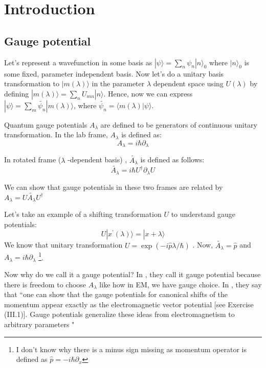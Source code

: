 \documentclass[11pt,a4paper]{article}
\begin{document}
 

\section{Introduction}

\subsection{Gauge potential}
Let's represent a wavefunction in some basis as $|\psi \rangle= \sum_n \psi_n |n \rangle_0$
where $|n \rangle_0$ is some fixed, parameter independent basis. Now let's do a unitary basis transformation to $|m (\lambda) \rangle$ in the parameter $\lambda$ dependent space using $U(\lambda)$ by defining $|m (\lambda) \rangle= \sum_n U_{mn} |n \rangle$. Hence, now we can express $|\psi \rangle = \sum_m \tilde{\psi_n}  |m (\lambda) \rangle $, where $\tilde{\psi_n}= \langle  m (\lambda) |\psi \rangle$. 
 
Quantum gauge potentials $A_{\lambda}$ are defined to be generators of continuous unitary transformation. In the lab frame, $A_{\lambda}$ is defined as:
\begin{equation}
\boxed{A_{\lambda}=  i \hbar \partial_{\lambda}}
\end{equation}

In rotated frame ($\lambda$ -dependent basis) , $\tilde{A_{\lambda}}$ is defined as follows:
\begin{equation}
\boxed{\tilde{A_{\lambda}}= i \hbar U^{\dagger} \partial_{\lambda} U}
\end{equation}


We can show that gauge potentials in these two frames are related by $A_{\lambda}= U \tilde{A_{\lambda}} U^{\dagger}$


Let's take an example of a shifting transformation $U$ to understand gauge potentials:
\begin{equation}
U |x^{\prime} (\lambda) \rangle =|x + \lambda \rangle
\end{equation}
We know that unitary transformation $U= \exp( - i \hat{p} \lambda/ \hbar)$ . Now, $\tilde{A_{\lambda}} =\hat{p}$ and $A_{\lambda}= i \hbar \partial_{\lambda}$ \footnote{I don't know why there is a minus sign missing as momentum operator is defined as $\hat{p}= - i \hbar \partial_{x}$}. 


Now why do we call it a gauge potential? In \cite{kolodrubetz2016geometry}, they call it gauge potential because there is freedom to choose $ A_{\lambda}$ like how in EM, we have gauge choice. In \cite{kolodrubetz2016geometry}, they say that
``one can show that the gauge potentials for canonical shifts of the momentum appear exactly as the electromagnetic vector potential [see Exercise (III.1)]. Gauge potentials generalize these ideas from electromagnetism to arbitrary parameters "
\end{document}
